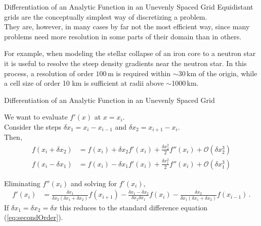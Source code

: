 \documentclass[11pt]{beamer}
\begin{document}
\begin{frame}[fragile]{Differentiation of an Analytic Function in an Unevenly Spaced Grid}
Equidistant grids are the conceptually simplest way of discretizing a
problem. \\
\bigskip
\pause
They are, however, in many cases by far not the most
efficient way, since many problems need more resolution in some parts
of their domain than in others. \\
\bigskip
\pause
 
For example, when modeling the stellar
collapse of an iron core to a neutron star it is useful to resolve the steep density
gradients near the neutron star. In this process, a resolution of order $100\,\mathrm{m}$
is required within $\sim 30\,\mathrm{km}$ of the origin, while a cell size
of order 10 km is sufficient at radii above $\sim$1000\,km. \\
\end{frame}


\begin{frame}[fragile]{Differentiation of an Analytic Function in an Unevenly Spaced Grid}
\small

We want to evaluate $f'(x)$ at $x = x_i$. \\
Consider the steps $\delta x_1 = x_i - x_{i-1}$
and $\delta x_2 = x_{i+1} - x_i$.\\

\pause
Then,
\begin{equation}
\begin{aligned}
f(x_i + \delta x_2) &= f(x_i) + \delta x_2 f'(x_i) + \frac{\delta x_2^2}{2} f''(x_i) +
\mathcal{O}(\delta x_2^3) \\
f(x_i - \delta x_1) &= f(x_i) - \delta x_1 f'(x_i) + \frac{\delta x_1^2}{2} f''(x_i) +
\mathcal{O}(\delta x_1^3) 
\end{aligned}
\end{equation}

\pause

Eliminating $f''(x_i)$ and solving for $f'(x_i)$,
\begin{equation}
\begin{aligned}
f'(x_i) &= \frac{\delta x_1}{\delta x_2(\delta x_1+\delta x_2)} f(x_{i+1}) - \frac{\delta x_1 - \delta x_2}{\delta x_2 \delta x_1} f(x_i)
- \frac{\delta x_2}{\delta x_1(\delta x_1 + \delta x_2)} f(x_{i-1}) \,.
\end{aligned}
\end{equation}
\pause
If $\delta x_1 = \delta x_2 = \delta x$ this reduces to the standard difference equation (\ref{eq:secondOrder}).
\normalsize
\end{frame}
\end{document}
